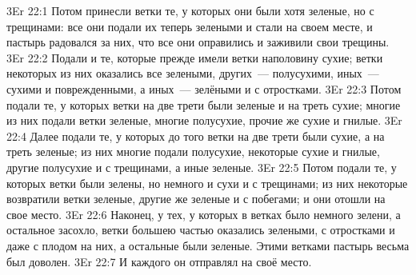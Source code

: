 \vs 3Er 22:1
Потом принесли ветки те, у
которых они были хотя зеленые, но с трещинами: все они подали их теперь
зелеными и стали на своем месте, и пастырь радовался за них, что все они
оправились и заживили свои трещины.
\vs 3Er 22:2
Подали и те, которые
прежде имели ветки наполовину сухие; ветки некоторых из них оказались все
зелеными, других~--- полусухими, иных~--- сухими и поврежденными,
а иных~--- зелёными и с отростками.
\vs 3Er 22:3
Потом подали те, у которых
ветки на две трети были зеленые и на треть сухие; многие из них подали ветки
зеленые, многие полусухие, прочие же сухие и гнилые.
\vs 3Er 22:4
Далее подали те, у которых
до того ветки на две трети были сухие, а на треть зеленые; из них многие
подали полусухие, некоторые сухие и гнилые, другие полусухие и с трещинами, а
иные зеленые.
\vs 3Er 22:5
Потом подали те, у которых
ветки были зелены, но немного и сухи и с трещинами; из них некоторые
возвратили ветки зеленые, другие же зеленые и с побегами; и они отошли на свое
место.
\vs 3Er 22:6
Наконец, у тех, у которых
в ветках было немного зелени, а остальное засохло, ветки большею частью
оказались зелеными, с отростками и даже с плодом на них, а остальные были
зеленые. Этими ветками пастырь весьма был доволен.
\vs 3Er 22:7
И каждого он отправлял на
своё место.


